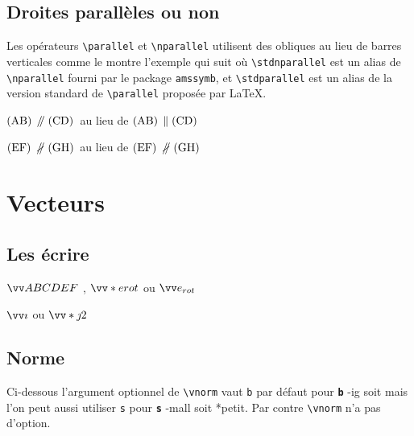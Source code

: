 \documentclass[12pt,a4paper]{article}
\makeatletter
\newcommand\env[1]{\texttt{#1}}
\newcommand\macro[1]{\env{\textbackslash{}#1}}
\theoremstyle{definition}
\newcommand\whyprefix[2]{%
	\textbf{\prefix{#1}}-#2%
}
\newcommand\prefix[1]{%
	\texttt{#1}%
}
\newcommand\inenglish{\@ifstar{\@inenglish@star}{\@inenglish@no@star}}
\newcommand\@inenglish@star[1]{%
	\emph{\og #1 \fg}%
}
\newcommand\@inenglish@no@star[1]{%
	\@inenglish@star{#1} en anglais%
}
\newcounter{paraexample}[subsubsection]
\newcommand\@newexample@abstract[2]{%
	\paragraph{%
		#1%
		\if\relax\detokenize{#2}\relax\else {} -- #2\fi%
	}%
}
\newcommand\newparaexample{\@ifstar{\@newparaexample@star}{\@newparaexample@no@star}}
\newcommand\@newparaexample@no@star[1]{%
	\refstepcounter{paraexample}%
	\@newexample@abstract{Exemple \theparaexample}{#1}%
}
\newcommand\@newparaexample@star[1]{%
	\@newexample@abstract{Exemple}{#1}%
}
\makeatother
\begin{document}


\subsection{Droites parallèles ou non}

Les opérateurs \macro{parallel} et \macro{nparallel} utilisent des obliques au lieu de barres verticales comme le montre l'exemple qui suit où \macro{stdnparallel} est un alias de \macro{nparallel} fourni par le package \verb+amssymb+, et \macro{stdparallel} est un alias de la version standard de \macro{parallel} proposée par \LaTeX{}.

\begin{latexex}
$\pgline{A}{B} \parallel \pgline{C}{D}$
au lieu de
$\pgline{A}{B}
 \stdparallel \pgline{C}{D}$

$\pgline{E}{F} \nparallel \pgline{G}{H}$
au lieu de
$\pgline{E}{F}
 \stdnparallel \pgline{G}{H}$
\end{latexex}


\section{Vecteurs}

\subsection{Les écrire}

\newparaexample{}

\begin{latexex}
$\vect{ABCDEF}$  ,
$\vect*{e}{rot}$ ou
$\vect{e_{rot}}$
\end{latexex}




\newparaexample{}

\begin{latexex}
$\vect{i}$ ou
$\vect*{j}{2}$
\end{latexex}



\subsection{Norme}

Ci-dessous l'argument optionnel de \macro{vnorm} vaut \prefix{b} par défaut pour \whyprefix{b}{ig} soit \inenglish{gros} mais l'on peut aussi utiliser \prefix{s} pour \whyprefix{s}{mall} soit \inenglish*{petit}. Par contre \macro{vnorm} n'a pas d'option.
\end{document}
